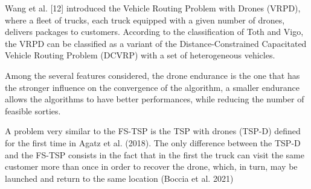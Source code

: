\documentclass[twocolumn]{article}
\begin{document}
	Wang et al. [12] introduced the Vehicle Routing Problem with Drones (VRPD), where a ﬂeet of trucks, each truck equipped with a given number of drones, delivers packages to customers. According to the classiﬁcation of Toth and Vigo, the VRPD can be classiﬁed as a variant of the Distance-Constrained Capacitated Vehicle Routing Problem (DCVRP) with a set of heterogeneous
	vehicles.
	\par 
	Among the several features considered, the drone endurance is the one that
	has the stronger influence on the convergence of the algorithm, a smaller endurance
	allows the algorithms to have better performances, while reducing the number of
	feasible sorties.
	\par 
	A problem very similar to the FS-TSP is the TSP with drones (TSP-D) defined for the first time in Agatz et al. (2018). The only
	difference between the TSP-D and the FS-TSP consists in the fact that in the first the truck can visit the same customer more than once in
	order to recover the drone, which, in turn, may be launched and return to the same location (Boccia et al. 2021)
	
	
\end{document}
